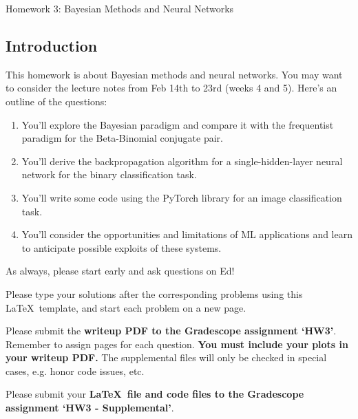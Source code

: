 \documentclass[submit]{harvardml}
\begin{document}
\begin{center}
{\Large Homework 3: Bayesian Methods and Neural Networks}\\
\end{center}

\subsection*{Introduction}

This homework is about Bayesian methods and neural networks. You may want to consider the lecture notes from Feb 14th to 23rd (weeks 4 and 5). Here's an outline of the questions:

\begin{enumerate}
  \item You'll explore the Bayesian paradigm and compare it with the frequentist paradigm for the Beta-Binomial conjugate pair.
  \item You'll derive the backpropagation algorithm for a single-hidden-layer neural network for the binary classification task.
  \item You'll write some code using the PyTorch library for an image classification task.
  \item You'll consider the opportunities and limitations of ML applications and learn to anticipate possible exploits of these systems.
\end{enumerate}

As always, please start early and ask questions on Ed!

Please type your solutions after the corresponding problems using this
\LaTeX\ template, and start each problem on a new page.

Please submit the \textbf{writeup PDF to the Gradescope assignment `HW3'}. Remember to assign pages for each question.  \textbf{You must include your plots in your writeup PDF. } The supplemental files will only be checked in special cases, e.g. honor code issues, etc.

Please submit your \textbf{\LaTeX\ file and code files to the Gradescope assignment `HW3 - Supplemental'}. \\


\newpage

\end{document}
